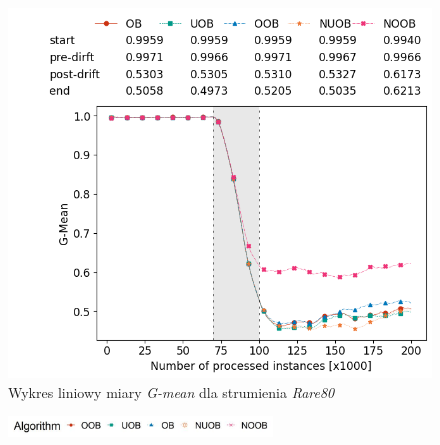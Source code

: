 \begin{figure}[h]
    \centering
    \includegraphics[width=12cm]{figures/rare80_gmean.png}
    \caption{Wykres liniowy miary \textit{G-mean} dla strumienia \textit{Rare80}}\label{Figure:Rare80}
\end{figure}

\begin{figure}[h]
    \centering
    \includegraphics[width=7cm]{figures/algorithms_legend.JPG}
\end{figure}

\vspace{-1.2cm}

